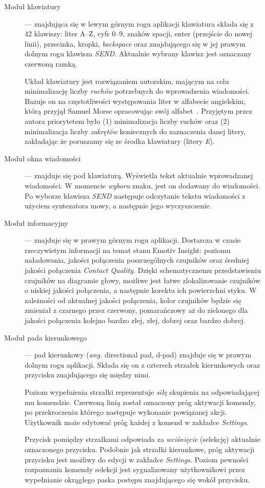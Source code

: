 \documentclass[skorowidz,skroty]{dyplomWEZUT}
\begin{document}
\begin{description}
    \item [Moduł klawiatury] --- znajdująca się w lewym górnym rogu aplikacji klawiatura składa się z 42 klawiszy: liter A--Z, cyfr 0--9, znaków spacji, enter (przejście do nowej linii), przecinka, kropki, \textit{backspace} oraz znajdującego się w jej prawym dolnym rogu klawisza \textit{SEND}. Aktualnie wybrany klawisz jest oznaczany czerwoną ramką.
    
    Układ klawiatury jest rozwiązaniem autorskim, mającym na celu minimalizację liczby \textit{ruchów} potrzebnych do wprowadzenia wiadomości. Bazuje on na częstotliwości występowania liter w alfabecie angielskim, którą przyjął Samuel Morse opracowując swój alfabet~\cite{morse}. Przyjętym przez autora priorytetem było (1) minimalizacja liczby ruchów oraz (2) minimalizacja liczby \textit{zakrętów} koniecznych do zaznaczenia danej litery, zakładając że poruszamy się ze środka klawiatury (litery \textit{E}).

    \item [Moduł okna wiadomości] --- znajduje się pod klawiaturą. Wyświetla tekst aktualnie wprowadzanej wiadomości. W momencie \textit{wyboru} znaku, jest on dodawany do wiadomości. Po wyborze klawisza \textit{SEND} następuje odczytanie tekstu wiadomości z użyciem syntezatora mowy, a następnie jego wyczyszczenie.
    
    \item [Moduł informacyjny] --- znajduje się w prawym górnym rogu aplikacji. Dostarcza w czasie rzeczywistym informacji na temat stanu Emotiv Insight: poziomu naładowania, jakości połączenia poszczególnych czujników oraz średniej jakości połączenia \textit{Contact Quality}. Dzięki schematycznemu przedstawieniu czujników na diagramie głowy, możliwe jest łatwe zlokalizowanie czujników o niskiej jakości połączenia, a następnie korekta ich powierzchni styku. W zależności od aktualnej jakości połączenia, kolor czujników będzie się zmieniał z czarnego przez czerwony, pomarańczowy aż do zielonego dla jakości połączenia kolejno bardzo złej, złej, dobrej oraz bardzo dobrej.
    
    \item [Moduł pada kierunkowego] --- pad kierunkowy (\textit{ang.} directional pad, d-pad) znajduje się w prawym dolnym rogu aplikacji. Składa się on z czterech strzałek kierunkowych oraz przycisku znajdującego się między nimi. 
    
    Poziom wypełnienia strzałki reprezentuje \textit{siłę} skupienia na odpowiadającej mu komendzie. Czerwoną linią został oznaczony próg aktywacji komendy, po przekroczeniu którego następuje wykonanie powiązanej akcji. Użytkownik może edytować próg każdej z komend w zakładce \textit{Settings}. 

    Przycisk pomiędzy strzałkami odpowiada za \textit{wciśnięcie} (selekcję) aktualnie oznaczonego przycisku. Podobnie jak strzałki kierunkowe, próg aktywacji przycisku jest możliwy do edycji w zakładce \textit{Settings}. Poziom pewności rozpoznania komendy selekcji jest sygnalizowany użytkownikowi przez wypełnianie okrągłego paska postępu znajdującego się wokół przycisku.
\end{description}
\end{document}

